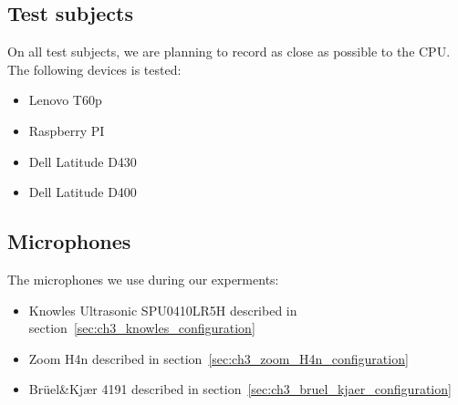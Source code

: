 \subsection{Test subjects}
On all test subjects, we are planning to record as close as possible to the CPU. 
The following devices is tested:

\begin{itemize}[topsep=-1em,parsep=0em,itemsep=0em]
 \item Lenovo T60p
 \item Raspberry PI
 \item Dell Latitude D430
 \item Dell Latitude D400
\end{itemize}

\subsection{Microphones}
The microphones we use during our experments:

\begin{itemize}[topsep=-1em,parsep=0em,itemsep=0em]
 \item Knowles Ultrasonic SPU0410LR5H described in section~\ref{sec:ch3_knowles_configuration}
 \item Zoom H4n described in section~\ref{sec:ch3_zoom_H4n_configuration}
 \item Brüel\&Kjær 4191 described in section~\ref{sec:ch3_bruel_kjaer_configuration}
\end{itemize}